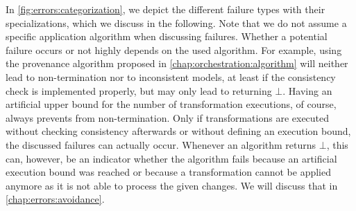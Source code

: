 In \autoref{fig:errors:categorization}, we depict the different failure types with their specializations, which we discuss in the following.
Note that we do not assume a specific application algorithm when discussing failures.
Whether a potential failure occurs or not highly depends on the used algorithm.
For example, using the provenance algorithm proposed in \autoref{chap:orchestration:algorithm} will neither lead to non-termination nor to inconsistent models, at least if the consistency check is implemented properly, but may only lead to returning $\bot$.
Having an artificial upper bound for the number of transformation executions, of course, always prevents from non-termination.
Only if transformations are executed without checking consistency afterwards or without defining an execution bound, the discussed failures can actually occur.
Whenever an algorithm returns $\bot$, this can, however, be an indicator whether the algorithm fails because an artificial execution bound was reached or because a transformation cannot be applied anymore as it is not able to process the given changes.
We will discuss that in \autoref{chap:errors:avoidance}.

